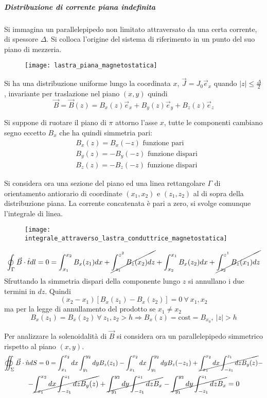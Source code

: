 \subparagraph{Distribuzione di corrente piana indefinita}
Si immagina un parallelepipedo non limitato attraversato da una certa corrente,
di spessore $\Delta$. Si colloca l'origine del sistema di riferimento in un punto 
del suo piano di mezzeria. 
\begin{figure}[H]
\centering
\texttt{[image: lastra\_piana\_magnetostatica]}
\end{figure}
Si ha una distribuzione uniforme lungo la coordinata $x$, $\vec{J} = J_0 \vec{e}_x $ quando
$|z| \leq \frac{\Delta}{2}$, invariante per traslazione nel piano $(x,y)$ quindi
$$
\vec{B} = \vec{B}(z) = B_x(z)\vec{e}_x + B_y(z)\vec{e}_y + B_z(z)\vec{e}_z
$$

Si suppone di ruotare il piano di $\pi$ attorno l'asse $x$, tutte le componenti cambiano
segno eccetto $B_x$ che ha quindi simmetria pari:
\begin{align*}
&B_x(z) = B_x(-z) \text{ funzione pari}\\
&B_y(z) = -B_y(-z) \text{ funzione dispari} \\
&B_z(z) = -B_z(-z) \text{ funzione dispari}
\end{align*}

Si considera ora una sezione del piano ed una linea rettangolare $\Gamma$ di orientamento
antiorario
di coordinate $(x_1,x_2) \text{ e } (z_1,z_2)$ al di sopra della distribuzione piana.
La corrente concatenata è pari a zero, si svolge comunque l'integrale di linea.
\begin{figure}[H]
\centering
\texttt{[image: integrale\_attraverso\_lastra\_conduttrice\_magnetostatica]}
\end{figure}
$$
\oint_\Gamma \vec{B}\cdot\hat{t}dl = 0 = \int_{x_1}^{x_2} B_x (z_1)dx + \cancel{\int_{z_1}^{z^2}B_z(x_2)dz} + \int_{x_2}^{x_1} B_x (z_2)dx + \cancel{\int_{z_2}^{z^1}B_z(x_1)dz} 
$$
Sfruttando la simmetria dispari della componente lungo $z$ si annullano i due termini in 
$dz$.
Quindi
$$
(x_2-x_1)\left[B_x(z_1) - B_x(z_2)\right] = 0 \ \forall \ x_1,x_2
$$
ma per la legge di annullamento del prodotto se $x_1\neq x_2$
$$
B_x(z_1) = B_x(z_2)\ \forall\ z_1,z_2 > h \Rightarrow B_x(z) = \text{cost} = B_{x_0},\ |z| > h
$$

Per analizzare la solenoidalità di $\vec{B}$ si considera ora un parallelepipedo
simmetrico rispetto al piano $(x,y)$.
$$
\oiint_\Sigma \vec{B}\cdot\hat{n}dS = 0 = \int_{x_1}^{x_2}dx \int_{y_1}^{y_2} dy B_z(z_1)
- \int_{x_1}^{x_2}dx \int_{y_1}^{y_2} dy B_z(-z_1) + \cancel{\int_{x_1}^{x_2}dx \int_{-z_1}^{z_1} dz B_y(z)} -
$$
$$
- \cancel{\int_{x_1}^{x_2}dx\int_{-z_1}^{z_1}dzB_y(z)} + \cancel{\int_{y_1}^{y_2}dy\int_{-z_1}^{z_1} dzB_x} - \cancel{\int_{y_1}^{y_2}dy\int_{-z_1}^{z_1}dzB_x} = 0
$$

